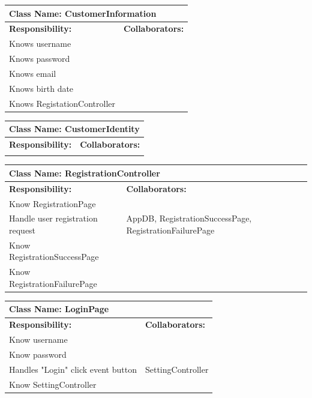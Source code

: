\documentclass[]{article}
\begin{document}
\begin{table}[H]
\centering
\begin{tabular}{|p{6cm}|p{6cm}|}
\hline 
 \multicolumn{2}{|l|}{\textbf{Class Name: CustomerInformation}} \\
\hline
\textbf{Responsibility:} & \textbf{Collaborators:} \\
\hline 
Knows username&\\ \hline
Knows password&\\ \hline 
Knows email&\\ \hline 
Knows birth date&\\ \hline 
Knows RegistationController &\\ \hline
\end{tabular}
\end{table}

\begin{table}[H]
\centering
\begin{tabular}{|p{6cm}|p{6cm}|}
\hline 
 \multicolumn{2}{|l|}{\textbf{Class Name: CustomerIdentity}} \\
\hline
\textbf{Responsibility:} & \textbf{Collaborators:} \\
\hline 
\vspace{1in} & \\
\hline
\end{tabular}
\end{table}

\begin{table}[H]
\centering
\begin{tabular}{|p{6cm}|p{6cm}|}
\hline 
 \multicolumn{2}{|l|}{\textbf{Class Name: RegistrationController}} \\
\hline
\textbf{Responsibility:} & \textbf{Collaborators:} \\
\hline
Know RegistrationPage&\\ \hline
Handle user registration request & AppDB, RegistrationSuccessPage, RegistrationFailurePage\\ \hline
Know RegistrationSuccessPage &\\ \hline
Know RegistrationFailurePage &\\ \hline
\end{tabular}
\end{table}

\begin{table}[H]
\centering
\begin{tabular}{|p{6cm}|p{6cm}|}
\hline 
 \multicolumn{2}{|l|}{\textbf{Class Name: LoginPage}} \\
\hline
\textbf{Responsibility:} & \textbf{Collaborators:} \\
\hline
Know username & \\ \hline
Know password & \\ \hline
Handles "Login" click event button & SettingController\\ \hline
Know SettingController &\\ \hline
\end{tabular}
\end{table}
\end{document}
